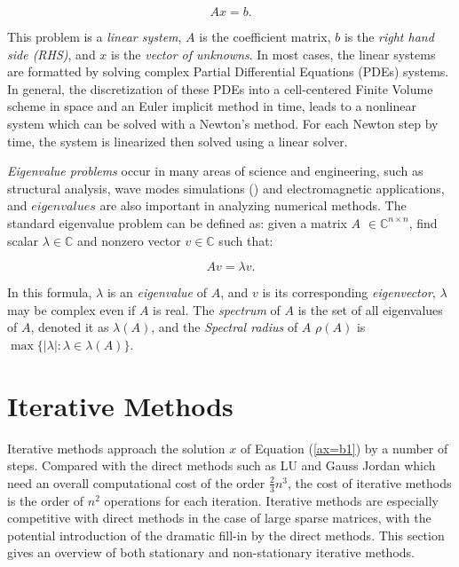 \begin{equation}
\label{ax=b1}
Ax=b.
\end{equation}

This problem is a \textit{linear system}, $A$ is the coefficient matrix, $b$ is the \textit{right hand side (RHS)}, and $x$ is the \textit{vector of unknowns}. In most cases, the linear systems are formatted by solving complex Partial Differential Equations (PDEs) systems. In general, the discretization of these PDEs into a cell-centered Finite Volume scheme in space and an Euler implicit method in time, leads to a nonlinear system which can be solved with a Newton’s method. For each Newton step by time, the system is linearized then solved using a linear solver.

\textit{Eigenvalue problems} occur in many areas of science and engineering, such as structural analysis, wave modes simulations (\cite{liu2018highly}) and electromagnetic applications, and $eigenvalues$ are also important in analyzing numerical methods. The standard eigenvalue problem can be defined as: given a matrix $A$ $\in \mathbb{C}^{n \times n}$, find scalar $\lambda \in \mathbb{C}$ and nonzero vector $v \in \mathbb{C}$ such that: 

\begin{equation}
\label{av=lv}
Av=\lambda v.
\end{equation}

In this formula, $\lambda$ is an \textit{eigenvalue} of $A$, and $v$ is its corresponding \textit{eigenvector}, $\lambda$ may be complex even if $A$ is real. The \textit{spectrum} of $A$ is the set of all eigenvalues of $A$, denoted it as $\lambda(A)$, and the \textit{Spectral radius} of $A$ $\rho(A)$ is $\max\{|\lambda|: \lambda \in \lambda(A)\}$. 

\section{Iterative Methods}

Iterative methods approach the solution $x$ of Equation (\ref{ax=b1}) by a number of steps. Compared with the direct methods such as LU and Gauss Jordan which need an overall computational cost of the order $\frac{2}{3}n^3$, the cost of iterative methods is the order of $n^2$ operations for each iteration. Iterative methods are especially competitive with direct methods in the case of large sparse matrices, with the potential introduction of the dramatic fill-in by the direct methods. This section gives an overview of both stationary and non-stationary iterative methods.

